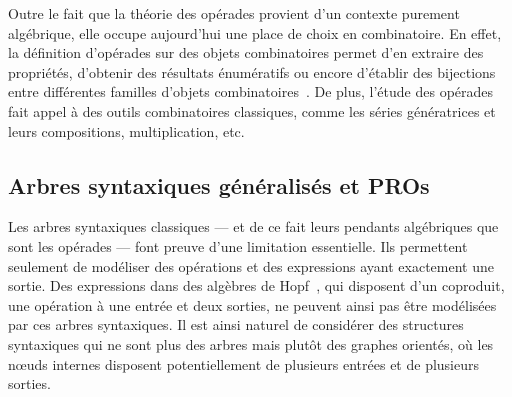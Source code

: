 \documentclass[10pt,reqno]{amsart}
\numberwithin{equation}{subsection}
\begin{document}
Outre le fait que la théorie des opérades provient d'un contexte purement
algébrique, elle occupe aujourd'hui une place de choix en combinatoire. 
En effet, la définition d'opérades sur des objets combinatoires permet 
d'en extraire des propriétés, d'obtenir des résultats énumératifs ou 
encore d'établir des bijections entre différentes familles d'objets
combinatoires~\cite{Cha08,CG14,Gir15}. De plus, l'étude des opérades 
fait appel à des outils combinatoires classiques, comme les séries 
génératrices et leurs compositions, multiplication, etc.

\subsection{Arbres syntaxiques généralisés et PROs}
Les arbres syntaxiques classiques --- et de ce fait leurs pendants 
algébriques que sont les opérades --- font preuve d'une limitation 
essentielle. Ils permettent seulement de modéliser des opérations et des
expressions ayant exactement une sortie. Des expressions dans des 
algèbres de Hopf~\cite{GR14}, qui disposent d'un coproduit, une opération 
à une entrée et deux sorties, ne peuvent ainsi pas être modélisées par 
ces arbres syntaxiques. Il est ainsi naturel de considérer des structures
syntaxiques qui ne sont plus des arbres mais plutôt des graphes orientés, 
où les n\oe uds internes disposent potentiellement de plusieurs entrées 
et de plusieurs sorties.
\end{document}
